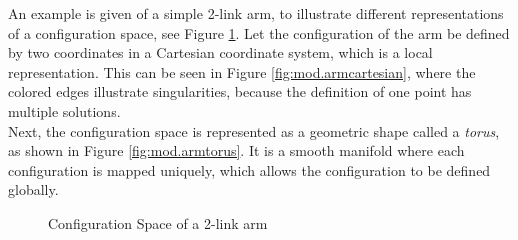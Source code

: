 An example is given of a simple 2-link arm, to illustrate different representations of a configuration space, see Figure \ref{fig:mod.armmanifold}.
Let the configuration of the arm be defined by two coordinates in a Cartesian coordinate system, which is a local representation.
This can be seen in Figure \ref{fig:mod.armcartesian}, where the colored edges illustrate singularities, because the definition of one point has multiple solutions.\\
Next, the configuration space is represented as a geometric shape called a \textit{torus}, as shown in Figure \ref{fig:mod.armtorus}. It is a smooth manifold where each configuration is mapped uniquely, which allows the configuration to be defined globally.
\begin{figure}[h!]
	\centering
	\caption{Configuration Space of a 2-link arm\label{fig:mod.armmanifold}}
\end{figure}		


